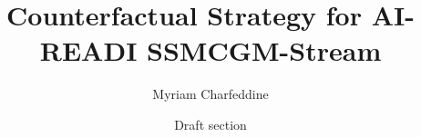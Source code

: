 \documentclass[11pt]{article}
\title{Counterfactual Strategy for AI-READI SSMCGM-Stream}
\author{Myriam Charfeddine}
\date{Draft section}
\begin{document}
\maketitle

{\small}
\end{document}
